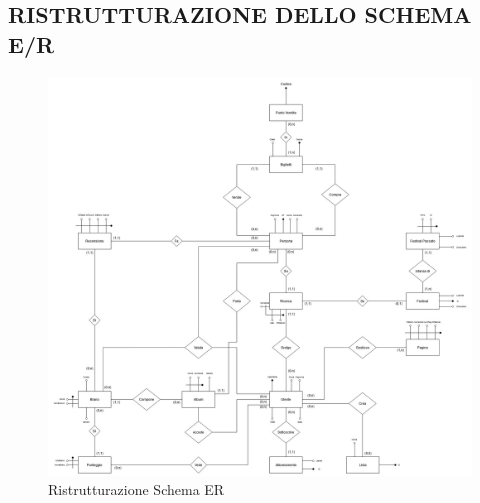 \documentclass{article}
\begin{document}
\subsection{RISTRUTTURAZIONE DELLO SCHEMA E/R}
\begin{figure}[ht]
    \centering
    \includegraphics[width=1\linewidth]{Schema Logico.jpg}
    \caption{Ristrutturazione Schema ER}
    \label{fig:enter-label}
\end{figure}
\newpage
\end{document}
